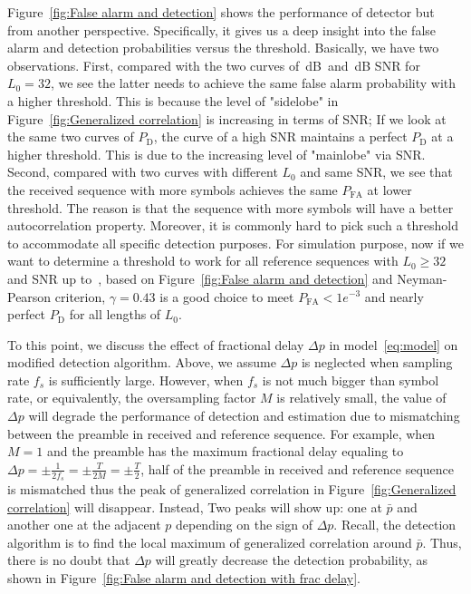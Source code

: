 Figure~\ref{fig:False alarm and detection} shows the performance of detector but from another perspective. Specifically, it gives us a deep insight into
the false alarm and detection probabilities versus the threshold. 
Basically, we have two observations. First, compared with the two curves of~dB~and~dB SNR for $L_0=32$,
we see the latter needs to achieve the same false alarm probability with a higher threshold. This is because the level of "sidelobe" in Figure~\ref{fig:Generalized correlation} is
increasing in terms of SNR; If we look at the same two curves of $P_{\text{D}}$, the curve of a high SNR maintains a perfect $P_{\text{D}}$ at a higher threshold. This is due to
the increasing level of "mainlobe" via SNR. Second, compared with two curves with different $L_0$ and same SNR, we see that the received sequence with more symbols achieves the same $P_{\text{FA}}$
at lower threshold. The reason is that the sequence with more symbols will have a better autocorrelation property.  
Moreover, it is commonly hard to pick such a threshold to accommodate all specific detection purposes.
For simulation purpose, now if we want to determine a threshold to work for all reference sequences with $L_0 {\geq} 32$ and SNR up to~\dB,
based on Figure~\ref{fig:False alarm and detection} and Neyman-Pearson criterion, $\gamma=0.43$ is a good choice to meet $P_{\text{FA}}<1e^{-3}$ and nearly perfect $P_{\text{D}}$ for all lengths of $L_0$.

To this point, we discuss the effect of fractional delay $\Delta p$ in model~\eqref{eq:model} on modified detection algorithm. 
Above, we assume $\Delta p$ is neglected when sampling rate $f_s$ is sufficiently large. 
However, when $f_s$ is not much bigger than symbol rate, 
or equivalently, the oversampling factor $M$ is relatively small, 
the value of $\Delta p$ will degrade the performance of detection and estimation due to
mismatching between the preamble in received and reference sequence.
For example, when $M{=}1$ and the preamble has the maximum fractional delay 
equaling to $\Delta p=\pm\frac{1}{2f_s}=\pm\frac{T}{2M}=\pm\frac{T}{2}$, 
half of the preamble in received and reference sequence is mismatched thus the peak of
generalized correlation in Figure~\ref{fig:Generalized correlation} will disappear.
Instead, Two peaks will show up: one at $\bar{p}$ and another one at the adjacent $p$ depending on the sign of $\Delta p$.
Recall, the detection algorithm is to find the local maximum of generalized correlation around $\bar{p}$.
Thus, there is no doubt that $\Delta p$ will greatly decrease the detection probability, as shown in Figure~\ref{fig:False alarm and detection with frac delay}.

